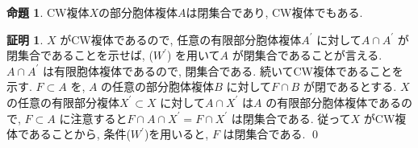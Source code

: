 \documentclass[10pt, fleqn, label-section=none]{bxjsarticle}
\theoremstyle{definition}
\newtheorem{prop}[dfn]{命題}
\newtheorem*{pf*}{証明}
\renewcommand{\;}{\, ; \,}
\begin{document}
\begin{prop}
CW複体$X$の部分胞体複体$A$は閉集合であり, CW複体でもある.
\end{prop}
\begin{pf*}
$X$ がCW複体であるので, 任意の有限部分胞体複体$A^\prime$ に対して$A \cap A^\prime $ が閉集合であることを示せば, ($W^\prime$) を用いて$A$ が閉集合であることが言える. $A \cap A^\prime$ は有限胞体複体であるので, 閉集合である.  続いてCW複体であることを示す. $F \subset A$ を, $A$ の任意の部分胞体複体$B$ に対して$F \cap B$ が閉であるとする. $X$ の任意の有限部分複体$X^\prime \subset X$ に対して$A \cap X^\prime$ は$A$ の有限部分胞体複体であるので, $F \subset A$ に注意すると$F \cap A \cap X^\prime = F \cap X^\prime$ は閉集合である. 従って$X$ がCW複体であることから, 条件($W^\prime$)を用いると, $F$ は閉集合である. 
\qed
\end{pf*}
\end{document}
